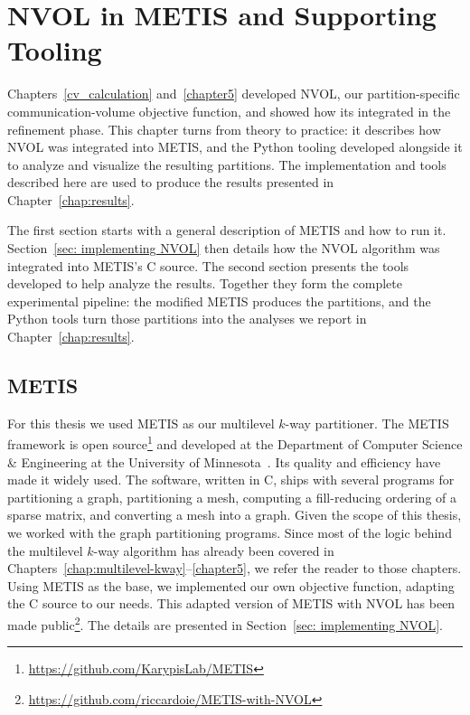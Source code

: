 \chapter{NVOL in METIS and Supporting Tooling}\label{chap:NVOL tooling}
Chapters~\ref{cv_calculation} and~\ref{chapter5} developed NVOL, our partition-specific communication-volume objective function, and showed how its integrated in the refinement phase. This chapter turns from theory to practice: it describes how NVOL was integrated into METIS, and the Python tooling developed alongside it to analyze and visualize the resulting partitions. The implementation and tools described here are used to produce the results presented in Chapter~\ref{chap:results}.

The first section starts with a general description of METIS and how to run it. Section~\ref{sec: implementing NVOL} then details how the NVOL algorithm was integrated into METIS's C source. The second section presents the tools developed to help analyze the results. Together they form the complete experimental pipeline: the modified METIS produces the partitions, and the Python tools turn those partitions into the analyses we report in Chapter~\ref{chap:results}.


\section{METIS} \label{sec:Metis very general description}
For this thesis we used METIS as our multilevel $k$-way partitioner. The METIS framework is open source\footnote{\url{https://github.com/KarypisLab/METIS}} and developed at the Department of Computer Science \& Engineering at the University of Minnesota~\cite{KarypisGeorge1997MASP}. Its quality and efficiency have made it widely used. The software, written in C, ships with several programs for partitioning a graph, partitioning a mesh, computing a fill-reducing ordering of a sparse matrix, and converting a mesh into a graph. Given the scope of this thesis, we worked with the graph partitioning programs. Since most of the logic behind the multilevel $k$-way algorithm has already been covered in Chapters~\ref{chap:multilevel-kway}--\ref{chapter5}, we refer the reader to those chapters. Using METIS as the base, we implemented our own objective function, adapting the C source to our needs. This adapted version of METIS with NVOL has been made public\footnote{\url{https://github.com/riccardoie/METIS-with-NVOL}}. The details are presented in Section~\ref{sec: implementing NVOL}.

